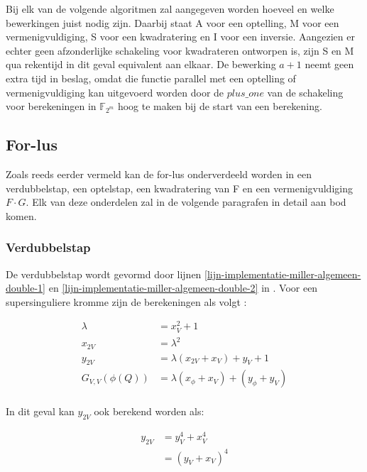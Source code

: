 Bij elk van de volgende algoritmen zal aangegeven worden hoeveel en welke bewerkingen juist nodig zijn. Daarbij staat \textsf{A} voor een optelling, \textsf{M} voor een vermenigvuldiging, \textsf{S} voor een kwadratering en \textsf{I} voor een inversie. Aangezien er echter geen afzonderlijke schakeling voor kwadrateren ontworpen is, zijn \textsf{S} en \textsf{M} qua rekentijd in dit geval equivalent aan elkaar. De bewerking $a + 1$ neemt geen extra tijd in beslag, omdat die functie parallel met een optelling of vermenigvuldiging kan uitgevoerd worden door de $plus\_one$ van de schakeling voor berekeningen in $\mathbb{F}_{2^m}$ hoog te maken bij de start van een berekening.

\subsection{For-lus\label{subsectie-implementatie-miller-forlus}}

Zoals reeds eerder vermeld kan de for-lus onderverdeeld worden in een verdubbelstap, een optelstap, een kwadratering van F en een vermenigvuldiging $F \cdot G$. Elk van deze onderdelen zal in de volgende paragrafen in detail aan bod komen.

\subsubsection{Verdubbelstap}

De verdubbelstap wordt gevormd door lijnen \ref{lijn-implementatie-miller-algemeen-double-1} en \ref{lijn-implementatie-miller-algemeen-double-2} in . Voor een supersinguliere kromme zijn de berekeningen als volgt \cite{bertoni, hankerson-book}:

\[\begin{aligned}
	\lambda &= x_V^2 + 1\\
	x_{2V} &= \lambda ^2\\
	y_{2V} &= \lambda (x_{2V} + x_V) + y_V + 1\\
	G_{V,V}(\phi(Q)) &= \lambda (x_{\phi} + x_V) + (y_{\phi} + y_V)\\
\end{aligned}\]

In dit geval kan $y_{2V}$ ook berekend worden als:

\[\begin{aligned}
y_{2V}	&= y_V^4 + x_V^4\\
			&= (y_V + x_V)^4\\	
\end{aligned}\]

